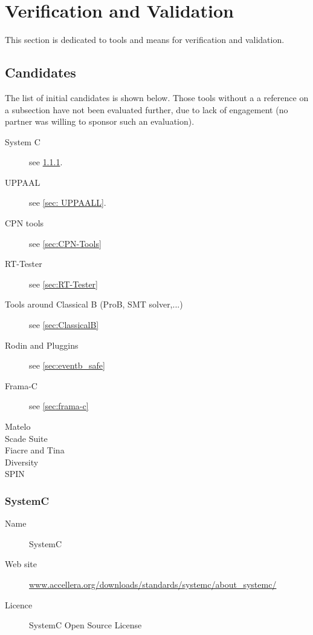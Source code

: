 

\chapter{Verification and Validation}
\label{sec:VnV}

This section is dedicated to tools and means for verification and validation.

\section{Candidates}


The list of initial candidates is shown below.  Those tools without a a reference on a subsection have not been evaluated further, due to lack of engagement (no partner was willing to sponsor such an evaluation).

\begin{description}

\item [System C] see \ref{sec:systemC}.
\item [UPPAAL] see \ref{sec: UPPAALL}.
\item [CPN tools] see \ref{sec:CPN-Tools}
\item [RT-Tester] see \ref{sec:RT-Tester}
\item [Tools around Classical B (ProB, SMT solver,...)] see \ref{sec:ClassicalB}
\item [Rodin and Pluggins] see \ref{sec:eventb_safe}
\item [Frama-C] see \ref{sec:frama-c}
\item [Matelo]
\item [Scade Suite]
\item [Fiacre and Tina]
\item [Diversity]
\item [SPIN]
\end{description}

\subsection{SystemC}
\label{sec:systemC}

\begin{description}
\item[Name] SystemC
\item[Web site] \url{www.accellera.org/downloads/standards/systemc/about_systemc/}
\item[Licence] SystemC Open Source License
\end{description}

